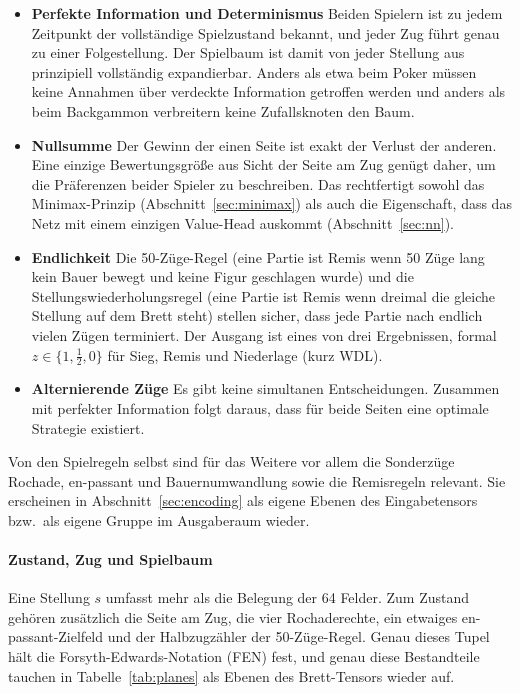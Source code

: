 \documentclass[
  a4paper, 12pt,
  parskip=half,
  headings=small,
  bibliography=totoc
]{scrartcl}
\begin{document}
\begin{itemize}
    \item \textbf{Perfekte Information und Determinismus} Beiden Spielern ist zu jedem Zeitpunkt der vollständige Spielzustand bekannt, und jeder Zug führt genau zu einer Folgestellung. Der Spielbaum ist damit von jeder Stellung aus prinzipiell vollständig expandierbar. Anders als etwa beim Poker müssen keine Annahmen über verdeckte Information getroffen werden und anders als beim Backgammon verbreitern keine Zufallsknoten den Baum.
    \item \textbf{Nullsumme} Der Gewinn der einen Seite ist exakt der Verlust der anderen. Eine einzige Bewertungsgröße aus Sicht der Seite am Zug genügt daher, um die Präferenzen beider Spieler zu beschreiben. Das rechtfertigt sowohl das Minimax-Prinzip (Abschnitt~\ref{sec:minimax}) als auch die Eigenschaft, dass das Netz mit einem einzigen Value-Head auskommt (Abschnitt~\ref{sec:nn}).
    \item \textbf{Endlichkeit} Die 50-Züge-Regel (eine Partie ist Remis wenn 50 Züge lang kein Bauer bewegt und keine Figur geschlagen wurde) und die Stellungswiederholungsregel (eine Partie ist Remis wenn dreimal die gleiche Stellung auf dem Brett steht) stellen sicher, dass jede Partie nach endlich vielen Zügen terminiert. Der Ausgang ist eines von drei Ergebnissen, formal \(z \in \{1, \tfrac{1}{2}, 0\}\) für Sieg, Remis und Niederlage (kurz WDL).
    \item \textbf{Alternierende Züge} Es gibt keine simultanen Entscheidungen. Zusammen mit perfekter Information folgt daraus, dass für beide Seiten eine optimale Strategie existiert.
\end{itemize}

Von den Spielregeln selbst sind für das Weitere vor allem die Sonderzüge Rochade, en-passant und Bauernumwandlung sowie die Remisregeln relevant. Sie erscheinen in Abschnitt~\ref{sec:encoding} als eigene Ebenen des Eingabetensors bzw.\ als eigene Gruppe im Ausgaberaum wieder.

\paragraph{Zustand, Zug und Spielbaum}
Eine Stellung \(s\) umfasst mehr als die Belegung der 64 Felder. Zum Zustand gehören zusätzlich die Seite am Zug, die vier Rochaderechte, ein etwaiges en-passant-Zielfeld und der Halbzugzähler der 50-Züge-Regel. Genau dieses Tupel hält die Forsyth-Edwards-Notation (FEN) fest, und genau diese Bestandteile tauchen in Tabelle~\ref{tab:planes} als Ebenen des Brett-Tensors wieder auf.
\end{document}
